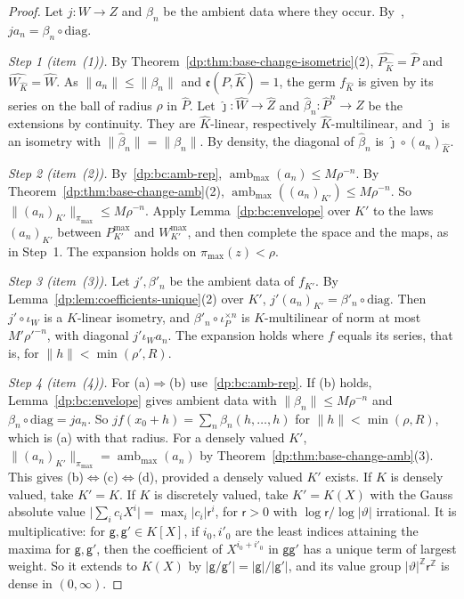 \documentclass[11pt]{amsart}
\theoremstyle{definition}
\theoremstyle{remark}
\numberwithin{equation}{section}
\newcommand{\Z}{\mathbb Z}
\newcommand{\abs}[1]{\lvert #1\rvert}
\newcommand{\norm}[1]{\lVert #1\rVert}
\newcommand{\Kh}{\widehat K}
\theoremstyle{plain}
\theoremstyle{definition}
\theoremstyle{plain}
\begin{document}
\begin{proof}
Let $j\colon W\to Z$ and $\beta_n$ be the ambient data where they occur. By~\cite[Proposition~14.9]{I}, $ja_n=\beta_n\circ\mathrm{diag}$.

\emph{Step 1 (item~(1)).} By Theorem~\ref{dp:thm:base-change-isometric}(2), $\widehat{P_{\Kh}}=\widehat P$ and $\widehat{W_{\Kh}}=\widehat W$. As $\norm{a_n}\le\norm{\beta_n}$ and $\mathfrak e(P,\Kh)=1$, the germ $f_{\Kh}$ is given by its series on the ball of radius $\rho$ in $\widehat P$. Let $\hat\jmath\colon\widehat W\to\widehat Z$ and $\hat\beta_n\colon\widehat P^n\to\widehat Z$ be the extensions by continuity. They are $\Kh$-linear, respectively $\Kh$-multilinear, and $\hat\jmath$ is an isometry with $\norm{\hat\beta_n}=\norm{\beta_n}$. By density, the diagonal of $\hat\beta_n$ is $\hat\jmath\circ(a_n)_{\Kh}$.

\emph{Step 2 (item~(2)).} By~\eqref{dp:bc:amb-rep}, $\operatorname{amb}_{\max}(a_n)\le M\rho^{-n}$. By Theorem~\ref{dp:thm:base-change-amb}(2), $\operatorname{amb}_{\max}((a_n)_{K'})\le M\rho^{-n}$. So $\norm{(a_n)_{K'}}_{\pi_{\max}}\le M\rho^{-n}$. Apply Lemma~\ref{dp:bc:envelope} over $K'$ to the laws $(a_n)_{K'}$ between $P^{\max}_{K'}$ and $W^{\max}_{K'}$, and then complete the space and the maps, as in Step~1. The expansion holds on $\pi_{\max}(z)<\rho$.

\emph{Step 3 (item~(3)).} Let $j',\beta'_n$ be the ambient data of $f_{K'}$. By Lemma~\ref{dp:lem:coefficients-unique}(2) over $K'$, $j'(a_n)_{K'}=\beta'_n\circ\mathrm{diag}$. Then $j'\circ\iota_W$ is a $K$-linear isometry, and $\beta'_n\circ\iota_P^{\times n}$ is $K$-multilinear of norm at most $M'\rho'^{-n}$, with diagonal $j'\iota_Wa_n$. The expansion holds where $f$ equals its series, that is, for $\norm h<\min(\rho',R)$.

\emph{Step 4 (item~(4)).} For (a)$\Rightarrow$(b) use~\eqref{dp:bc:amb-rep}. If (b) holds, Lemma~\ref{dp:bc:envelope} gives ambient data with $\norm{\beta_n}\le M\rho^{-n}$ and $\beta_n\circ\mathrm{diag}=ja_n$. So $jf(x_0+h)=\sum_n\beta_n(h,\dots,h)$ for $\norm h<\min(\rho,R)$, which is (a) with that radius. For a densely valued $K'$, $\norm{(a_n)_{K'}}_{\pi_{\max}}=\operatorname{amb}_{\max}(a_n)$ by Theorem~\ref{dp:thm:base-change-amb}(3). This gives (b)$\Leftrightarrow$(c)$\Leftrightarrow$(d), provided a densely valued $K'$ exists. If $K$ is densely valued, take $K'=K$. If $K$ is discretely valued, take $K'=K(X)$ with the Gauss absolute value $\abs{\sum_ic_iX^i}=\max_i\abs{c_i}\mathsf r^i$, for $\mathsf r>0$ with $\log\mathsf r/\log\abs\vartheta$ irrational. It is multiplicative: for $\mathsf g,\mathsf g'\in K[X]$, if $i_0,i'_0$ are the least indices attaining the maxima for $\mathsf g,\mathsf g'$, then the coefficient of $X^{i_0+i'_0}$ in $\mathsf g\mathsf g'$ has a unique term of largest weight. So it extends to $K(X)$ by $\abs{\mathsf g/\mathsf g'}=\abs{\mathsf g}/\abs{\mathsf g'}$, and its value group $\abs\vartheta^{\Z}\mathsf r^{\Z}$ is dense in $(0,\infty)$.


\end{proof}
\end{document}
